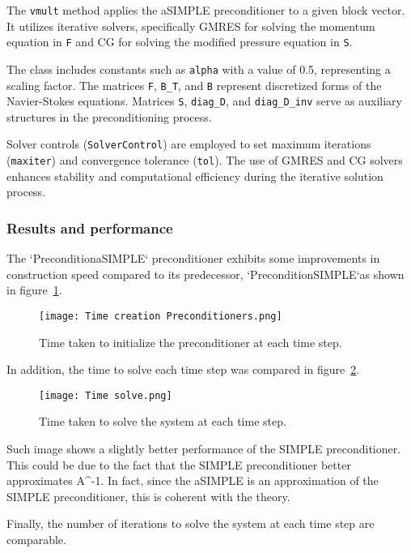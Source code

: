\documentclass{article}
\begin{document}
The \texttt{vmult} method applies the aSIMPLE preconditioner to a given block vector. It utilizes iterative solvers, specifically GMRES for solving the momentum equation in \texttt{F} and CG for solving the modified pressure equation in \texttt{S}.

The class includes constants such as \texttt{alpha} with a value of 0.5, representing a scaling factor. The matrices \texttt{F}, \texttt{B\_T}, and \texttt{B} represent discretized forms of the Navier-Stokes equations. Matrices \texttt{S}, \texttt{diag\_D}, and \texttt{diag\_D\_inv} serve as auxiliary structures in the preconditioning process.

Solver controls (\texttt{SolverControl}) are employed to set maximum iterations (\texttt{maxiter}) and convergence tolerance (\texttt{tol}). The use of GMRES and CG solvers enhances stability and computational efficiency during the iterative solution process.


\subsubsection{Results and performance}

The `PreconditionaSIMPLE` preconditioner exhibits some improvements in construction speed compared to its predecessor, `PreconditionSIMPLE`as shown in figure~\ref{fig:Time_prec}.
\begin{figure}[h]
    \centering
    \texttt{[image: Time creation Preconditioners.png]}
    \caption{Time taken to initialize the preconditioner at each time step.}
    \label{fig:Time_prec}
\end{figure}

In addition, the time to solve each time step was compared in figure~\ref{fig:Time_solve}.
\begin{figure}[H]
    \centering
    \texttt{[image: Time solve.png]}
    \caption{Time taken to solve the system at each time step.}
    \label{fig:Time_solve}
\end{figure}

Such image shows a slightly better performance of the SIMPLE preconditioner. This could be due to the fact that the SIMPLE preconditioner better approximates A^{-1}. In fact, since the aSIMPLE is an approximation of the SIMPLE preconditioner, this is coherent with the theory. 

Finally, the number of iterations to solve the system at each time step are comparable.
\end{document}
